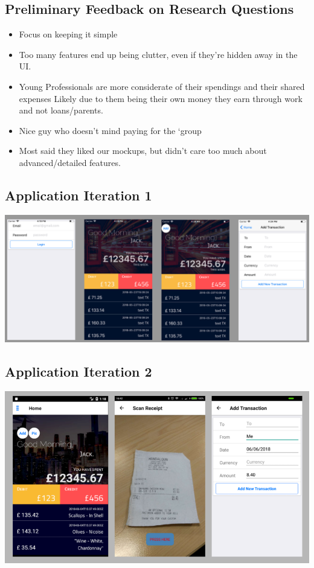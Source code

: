\documentclass[a4wide, 11pt]{article}
\begin{document}
\subsection{Preliminary Feedback on Research Questions}
\label{feedback}
\begin{itemize}
  \item Focus on keeping it simple
  \item Too many features end up being clutter, even if they’re hidden away in the UI.
  \item Young Professionals are more considerate of their spendings and their shared expenses
Likely due to them being their own money they earn through work and not loans/parents.
  \item Nice guy who doesn’t mind paying for the `group
  \item Most said they liked our mockups, but didn’t care too much about advanced/detailed features.
\end{itemize}

\subsection{Application Iteration 1}
\label{appIt1}
\includegraphics[width=\textwidth]{appIt1.png}

\subsection{Application Iteration 2}
\label{appIt2}
\includegraphics[width=\textwidth]{appIt2.png}
\end{document}
